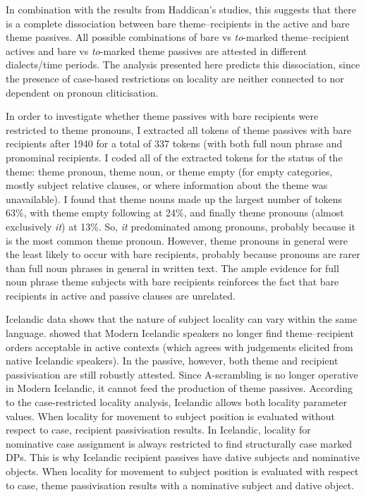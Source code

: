 In combination with the results from Haddican's studies, this suggests that there is a complete dissociation between bare theme--recipients in the active and bare theme passives. All possible combinations of bare vs \textit{to}-marked theme--recipient actives and bare vs \textit{to}-marked theme passives are attested in different dialects/time periods. The analysis presented here predicts this dissociation, since the presence of case-based restrictions on locality are neither connected to nor dependent on pronoun cliticisation.




In order to investigate whether theme passives with bare recipients were restricted to theme pronouns, I extracted all tokens of theme passives with bare recipients after 1940 for a total of 337 tokens (with both full noun phrase and pronominal recipients. I coded all of the extracted tokens for the status of the theme: theme pronoun, theme noun, or theme empty (for empty categories, mostly subject relative clauses, or where information about the theme was unavailable). I found that theme nouns made up the largest number of tokens 63\%, with theme empty following at 24\%, and finally theme pronouns (almost exclusively \textit{it}) at 13\%. So, \textit{it} predominated among pronouns, probably because it is the most common theme pronoun. However, theme pronouns in general were the least likely to occur with bare recipients, probably because pronouns are rarer than full noun phrases in general in written text. The ample evidence for full noun phrase theme subjects with bare recipients reinforces the fact that bare recipients in active and passive clauses are unrelated.

Icelandic data shows that the nature of subject locality can vary within the same language. \cite{Dehe.2004} showed that Modern Icelandic speakers no longer find theme--recipient orders acceptable in active contexts (which agrees with judgements elicited from native Icelandic speakers). In the passive, however, both theme and recipient passivisation are still robustly attested. Since A-scrambling is no longer operative in Modern Icelandic, it cannot feed the production of theme passives. According to the case-restricted locality analysis, Icelandic allows both locality parameter values. When locality for movement to subject position is evaluated without respect to case, recipient passivisation results. In Icelandic, locality for nominative case assignment is always restricted to find structurally case marked DPs. This is why Icelandic recipient passives have dative subjects and nominative objects. When locality for movement to subject position is evaluated with respect to case, theme passivisation results with a nominative subject and dative object. 


